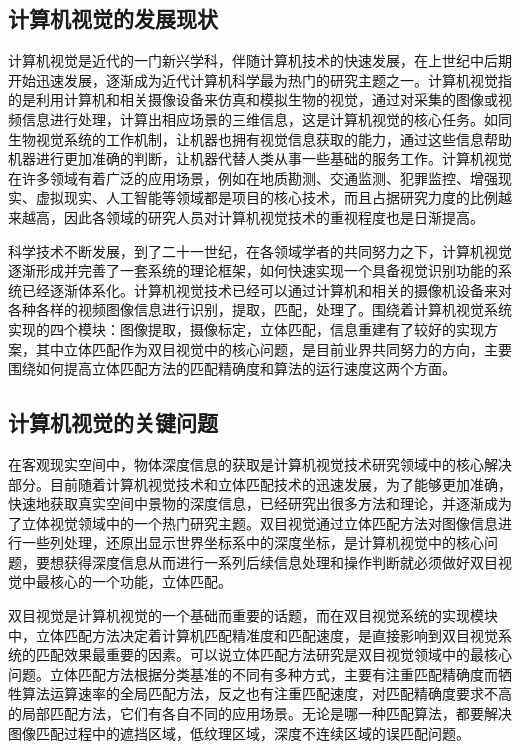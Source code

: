 \subsection{计算机视觉的发展现状}

计算机视觉是近代的一门新兴学科，伴随计算机技术的快速发展，在上世纪中后期开始迅速发展，逐渐成为近代计算机科学最为热门的研究主题之一。计算机视觉指的是利用计算机和相关摄像设备来仿真和模拟生物的视觉，通过对采集的图像或视频信息进行处理，计算出相应场景的三维信息，这是计算机视觉的核心任务。如同生物视觉系统的工作机制，让机器也拥有视觉信息获取的能力，通过这些信息帮助机器进行更加准确的判断，让机器代替人类从事一些基础的服务工作。计算机视觉在许多领域有着广泛的应用场景，例如在地质勘测、交通监测、犯罪监控、增强现实、虚拟现实、人工智能等领域都是项目的核心技术，而且占据研究力度的比例越来越高，因此各领域的研究人员对计算机视觉技术的重视程度也是日渐提高。

科学技术不断发展，到了二十一世纪，在各领域学者的共同努力之下，计算机视觉逐渐形成并完善了一套系统的理论框架，如何快速实现一个具备视觉识别功能的系统已经逐渐体系化。计算机视觉技术已经可以通过计算机和相关的摄像机设备来对各种各样的视频图像信息进行识别，提取，匹配，处理了。围绕着计算机视觉系统实现的四个模块：图像提取，摄像标定，立体匹配，信息重建有了较好的实现方案，其中立体匹配作为双目视觉中的核心问题，是目前业界共同努力的方向，主要围绕如何提高立体匹配方法的匹配精确度和算法的运行速度这两个方面。

\subsection{计算机视觉的关键问题}

在客观现实空间中，物体深度信息的获取是计算机视觉技术研究领域中的核心解决部分。目前随着计算机视觉技术和立体匹配技术的迅速发展，为了能够更加准确，快速地获取真实空间中景物的深度信息，已经研究出很多方法和理论，并逐渐成为了立体视觉领域中的一个热门研究主题。双目视觉通过立体匹配方法对图像信息进行一些列处理，还原出显示世界坐标系中的深度坐标，是计算机视觉中的核心问题，要想获得深度信息从而进行一系列后续信息处理和操作判断就必须做好双目视觉中最核心的一个功能，立体匹配。 

双目视觉是计算机视觉的一个基础而重要的话题，而在双目视觉系统的实现模块中，立体匹配方法决定着计算机匹配精准度和匹配速度，是直接影响到双目视觉系统的匹配效果最重要的因素。可以说立体匹配方法研究是双目视觉领域中的最核心问题。立体匹配方法根据分类基准的不同有多种方式，主要有注重匹配精确度而牺牲算法运算速率的全局匹配方法，反之也有注重匹配速度，对匹配精确度要求不高的局部匹配方法，它们有各自不同的应用场景。无论是哪一种匹配算法，都要解决图像匹配过程中的遮挡区域，低纹理区域，深度不连续区域的误匹配问题。

